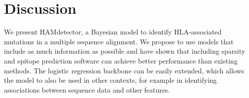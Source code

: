 \documentclass[fleqn,11pt]{SelfArx} %
\begin{document}
\section{Discussion}

We present HAMdetector, a Bayesian model to identify HLA-associated mutations in a multiple sequence alignment. We propose to use models that include as much information as possible and have shown that including sparsity and epitope prediction software can achieve better performance than existing methods. The logistic regression backbone can be easily extended, which allows the model to also be used in other contexts, for example in identifying associations between sequence data and other features.

\thispagestyle{empty} %


\FloatBarrier



\end{document}
